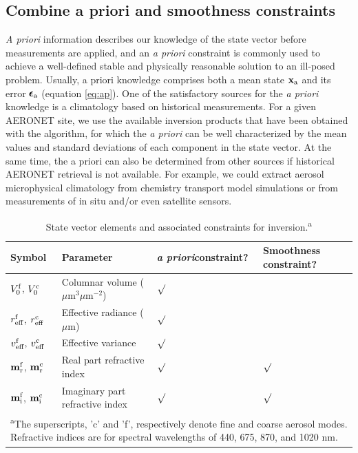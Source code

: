 \subsection{Combine a priori and smoothness constraints}
\label{subsec:ap}

\textit{A priori} information describes our knowledge of the state vector
 before measurements are applied, and an \textit{a priori} constraint is 
commonly used to achieve a well-defined stable and physically reasonable 
solution to an ill-posed problem. Usually, a priori knowledge comprises 
both a mean state $\mathbf{x}_\text{a}$ and its error $\pmb{\epsilon}_\text{a}$ (equation
\eqref{eq:ap}). One of the satisfactory sources for the \textit{a
priori} knowledge is a climatology based on historical measurements. For a given
AERONET site, we use the available inversion products that have been
obtained with the \Dub algorithm, for which the \textit{a priori} can be
well characterized by the mean values and standard deviations of each
component in the state vector. At the same time, the a priori can also
be determined from other sources if historical AERONET retrieval is not
available. For example, we could extract aerosol microphysical
climatology from chemistry transport model simulations
\citep[e.g.,][]{Wang10} or from measurements of in situ and/or even satellite
sensors.

\begin{table}[t]
  \centering
  \small
  \caption{State vector elements and associated constraints for
inversion.\textsuperscript{a}}
  \label{tab:xpars}
  \begin{tabular}{p{5em} p{15em} p{5em} p{5em} }
    \toprule
       Symbol & Parameter & \textit{a priori}\newline constraint? & Smoothness
constraint? \\
    \midrule
       $V_0^\text{f}$, $V_0^\text{c}$ & Columnar volume ($\mu$m$^3\mu$m$^{-2}$) & 
       $\surd$ & \\
       $r_\text{eff}^\text{f}$, $r_\text{eff}^\text{c}$ & Effective radiance ($\mu$m) &
       $\surd$ & \\
       $v_\text{eff}^\text{f}$, $v_\text{eff}^\text{c}$ & Effective variance  & $\surd$ & \\
       $\mathbf{m}_\text{r}^\text{f}$, $\mathbf{m}_\text{r}^\text{c}$ & 
       Real part refractive index & $\surd$ & $\surd$ \\
       $\mathbf{m}_\text{i}^\text{f}$, $\mathbf{m}_\text{i}^\text{c}$ &
       Imaginary part refractive index & $\surd$ & $\surd$ \\
    \bottomrule
    \multicolumn{4}{m{35em}}{\textsuperscript{a}The superscripts, 'c' and
'f', respectively denote fine and coarse aerosol modes. Refractive indices
are for spectral wavelengths of 440, 675, 870, and 1020 nm.}
  \end{tabular}
\end{table}

